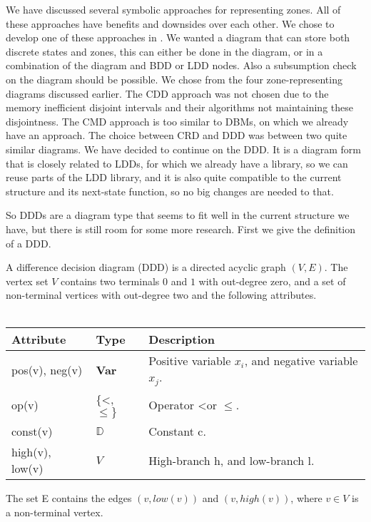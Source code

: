 We have discussed several symbolic approaches for representing zones. All of these approaches have benefits and downsides over each other. We chose to develop one of these approaches in \ltsmin{}. We wanted a diagram that can store both discrete states and zones, this can either be done in the diagram, or in a combination of the diagram and BDD or LDD nodes. Also a subsumption check on the diagram should be possible. We chose from the four zone-representing diagrams discussed earlier. The CDD approach was not chosen due to the memory inefficient disjoint intervals and their algorithms not maintaining these disjointness. The CMD approach is too similar to DBMs, on which we already have an approach. The choice between CRD and DDD was between two quite similar diagrams. We have decided to continue on the DDD. It is a diagram form that is closely related to LDDs, for which we already have a library, so we can reuse parts of the LDD library, and it is also quite compatible to the current \pins{} structure and its next-state function, so no big changes are needed to that. %

So DDDs are a diagram type that seems to fit well in the current structure we have, but there is still room for some more research. First we give the definition of a DDD.

\begin{mydef}
\label{def:DDD}
A difference decision diagram (DDD) is a directed acyclic graph $(V,E)$. The vertex set $V$ contains two terminals $0$ and $1$ with out-degree zero, and a set of non-terminal vertices with out-degree two and the following attributes.
\\\\
\begin{tabular}{lll}
Attribute                & Type                      & Description                                           \\\hline
pos(v), neg(v)           & \textbf{Var}              & Positive variable $x_i$, and negative variable $x_j$. \\
op(v)                    & \{\textless, $\leq\}$     & Operator \textless or $\leq$.                         \\
const(v)                 & $\mathbb{D}$              & Constant c.                                           \\
high(v), low(v)          & $V$                       & High-branch h, and low-branch l.                   
\end{tabular}
The set E contains the edges $(v,low(v))$ and $(v, high(v))$, where $v \in V$ is a non-terminal vertex.
\end{mydef}

